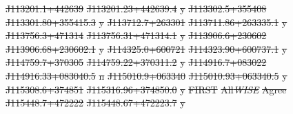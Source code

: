 \documentclass[11pt, a4paper]{book}
\providecommand{\DIFdeltex}[1]{{\protect\color{red}\sout{#1}}}                      %
\providecommand{\DIFdelFL}[1]{\DIFdel{#1}} %
\providecommand{\DIFdel}[1]{\texorpdfstring{\DIFdeltex{#1}}{}} %
\begin{document}
\DIFdelFL{J113201.1+442639 }%
\DIFdelFL{J113201.23+442639.4 }%
\DIFdelFL{y}%
\DIFdelFL{J113302.5+355408 }%
\DIFdelFL{J113301.80+355415.3 }%
\DIFdelFL{y}%
\DIFdelFL{J113712.7+263301 }%
\DIFdelFL{J113711.86+263335.1 }%
\DIFdelFL{y}%
\DIFdelFL{J113756.3+471314 }%
\DIFdelFL{J113756.31+471314.1 }%
\DIFdelFL{y}%
\DIFdelFL{J113906.6+230602 }%
\DIFdelFL{J113906.68+230602.1 }%
\DIFdelFL{y}%
\DIFdelFL{J114325.0+600721 }%
\DIFdelFL{J114323.90+600737.1 }%
\DIFdelFL{y}%
\DIFdelFL{J114759.7+370305 }%
\DIFdelFL{J114759.22+370311.2 }%
\DIFdelFL{y}%
\DIFdelFL{J114916.7+083022 }%
\DIFdelFL{J114916.33+083040.5 }%
\DIFdelFL{n}%
\DIFdelFL{J115010.9+063340 }%
\DIFdelFL{J115010.93+063340.5 }%
\DIFdelFL{y}%
\DIFdelFL{J115308.6+374851 }%
\DIFdelFL{J115316.96+374850.0 }%
\DIFdelFL{y}%
\DIFdelFL{FIRST }%
\DIFdelFL{All}\emph{\DIFdelFL{WISE}} %
\DIFdelFL{Agree}%
\DIFdelFL{J115448.7+472222 }%
\DIFdelFL{J115448.67+472223.7 }%
\DIFdelFL{y}%
\end{document}
